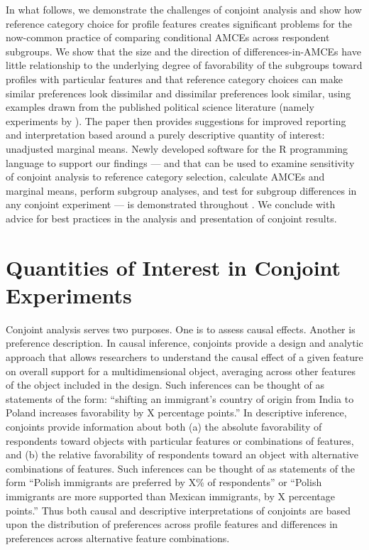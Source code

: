 \documentclass[a4paper,12pt]{article}\usepackage[]{graphicx}\usepackage[]{color}
\begin{document}
In what follows, we demonstrate the challenges of conjoint analysis and show how reference category choice for profile features creates significant problems for the now-common practice of comparing conditional AMCEs across respondent subgroups. We show that the size and the direction of differences-in-AMCEs have little relationship to the underlying degree of favorability of the subgroups toward profiles with particular features and that reference category choices can make similar preferences look dissimilar and dissimilar preferences look similar, using examples drawn from the published political science literature (namely experiments by \citealt{HainmuellerHopkinsYamamoto2014, BallardRosaMartinScheve2016, TeeleKallaRosenbluth2018}). The paper then provides suggestions for improved reporting and interpretation based around a purely descriptive quantity of interest: unadjusted marginal means. Newly developed software for the R programming language to support our findings --- and that can be used to examine sensitivity of conjoint analysis to reference category selection, calculate AMCEs and marginal means, perform subgroup analyses, and test for subgroup differences in any conjoint experiment --- is demonstrated throughout \citep{Leeper2018cregg}. We conclude with advice for best practices in the analysis and presentation of conjoint results.

\section*{Quantities of Interest in Conjoint Experiments}\label{sec:quantities}

Conjoint analysis serves two purposes. One is to assess causal effects. Another is preference description. In causal inference, conjoints provide a design and analytic approach that allows researchers to understand the causal effect of a given feature on overall support for a multidimensional object, averaging across other features of the object included in the design. Such inferences can be thought of as statements of the form: ``shifting an immigrant's country of origin from India to Poland increases favorability by X percentage points.'' In descriptive inference, conjoints provide information about both (a) the absolute favorability of respondents toward objects with particular features or combinations of features, and (b) the relative favorability of respondents toward an object with alternative combinations of features. Such inferences can be thought of as statements of the form ``Polish immigrants are preferred by X\% of respondents'' or ``Polish immigrants are more supported than Mexican immigrants, by X percentage points.'' Thus both causal and descriptive interpretations of conjoints are based upon the distribution of preferences across profile features and differences in preferences across alternative feature combinations.
\end{document}
